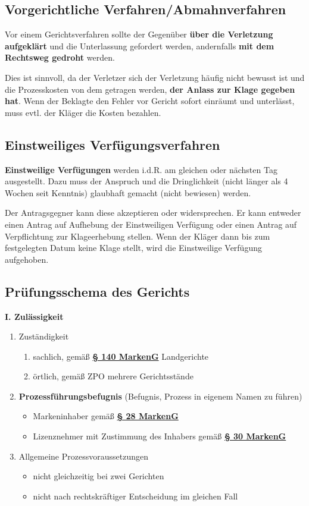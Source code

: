 \documentclass[12pt,A4]{extarticle}
\newcommand{\markenG}[2][]{\textbf{\textcolor{markenGesetzLink}{\href{https://www.gesetze-im-internet.de/markeng/__#2.html}{§ #2 \ifthenelse{\equal{#1}{}}{}{#1 }MarkenG}}}}
\begin{document}
\subsection{Vorgerichtliche Verfahren/Abmahnverfahren}
Vor einem Gerichtsverfahren sollte der Gegenüber \textbf{über die Verletzung aufgeklärt} und die Unterlassung gefordert werden, andernfalls \textbf{mit dem Rechtsweg gedroht} werden.\par
Dies ist sinnvoll, da der Verletzer sich der Verletzung häufig nicht bewusst ist und die Prozesskosten von dem getragen werden, \textbf{der Anlass zur Klage gegeben hat}. Wenn der Beklagte den Fehler vor Gericht sofort einräumt und unterlässt, muss evtl. der Kläger die Kosten bezahlen.

\subsection{Einstweiliges Verfügungsverfahren}
\textbf{Einstweilige Verfügungen} werden i.d.R. am gleichen oder nächsten Tag ausgestellt. Dazu muss der Anspruch und die Dringlichkeit (nicht länger als 4 Wochen seit Kenntnis) glaubhaft gemacht (nicht bewiesen) werden.\par
Der Antragsgegner kann diese akzeptieren oder widersprechen. Er kann entweder einen Antrag auf Aufhebung der Einstweiligen Verfügung oder einen Antrag auf Verpflichtung zur Klageerhebung stellen. Wenn der Kläger dann bis zum festgelegten Datum keine Klage stellt, wird die Einstweilige Verfügung aufgehoben.

\subsection{Prüfungsschema des Gerichts}
\textbf{I. Zulässigkeit}
\begin{enumerate}
  \item{Zuständigkeit
              \begin{enumerate}
                \item{sachlich, gemäß \markenG{140} Landgerichte}
                \item{örtlich, gemäß ZPO mehrere Gerichtsstände}
              \end{enumerate}
        }
  \item{\textbf{Prozessführungsbefugnis} (Befugnis, Prozess in eigenem Namen zu führen)
              \begin{itemize}
                \item{Markeninhaber gemäß \markenG{28}}
                \item{Lizenznehmer mit Zustimmung des Inhabers gemäß \markenG[Abs. 3]{30}}
              \end{itemize}
        }
  \item{Allgemeine Prozessvoraussetzungen
              \begin{itemize}
                \item{nicht gleichzeitig bei zwei Gerichten}
                \item{nicht nach rechtskräftiger Entscheidung im gleichen Fall}
              \end{itemize}
        }
\end{enumerate}
\end{document}
